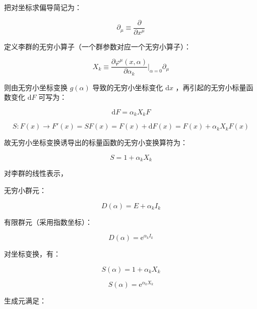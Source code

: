 把对坐标求偏导简记为：

\begin{equation}
\partial_\mu \equiv\frac{\partial }{\partial x^\mu }
\end{equation}

定义李群的无穷小算子（一个群参数对应一个无穷小算子）：

\begin{equation}
X_k
\equiv \frac{\partial \varphi^\mu\left(x,\alpha\right) }{\partial \alpha_k } \bigg|_{\alpha=0}\partial_\mu
\end{equation}

则由无穷小坐标变换 $g\left(\alpha\right)$  导致的无穷小坐标变化 $\mathrm{d}x$ ，再引起的无穷小标量函数变化 $\mathrm{d}F$ 可写为：

\begin{equation}
\mathrm{d}F = \alpha_k X_k F
\end{equation}

\begin{equation}
S:F\left(x\right)\to F'\left(x\right)
=SF\left(x\right)
=F\left(x\right)+\mathrm{d}F\left(x\right)
=F\left(x\right)+\alpha_kX_kF\left(x\right)
\end{equation}

故无穷小坐标变换诱导出的标量函数的无穷小变换算符为：

\begin{equation}
S
=1+\alpha_k X_k
\end{equation}

对李群的线性表示，

无穷小群元：

\begin{equation}
D\left(\alpha\right) = E+\alpha_k I_k
\end{equation}

有限群元（采用指数坐标）：

\begin{equation}
D\left(\alpha\right) = \mathrm{e}^{\alpha_k I_k}
\end{equation}

对坐标变换，有：

\begin{equation}
S\left(\alpha\right) = 1+\alpha_k X_k
\end{equation}

\begin{equation}
S\left(\alpha\right) = \mathrm{e}^{\alpha_k X_k}
\end{equation}

生成元满足：

